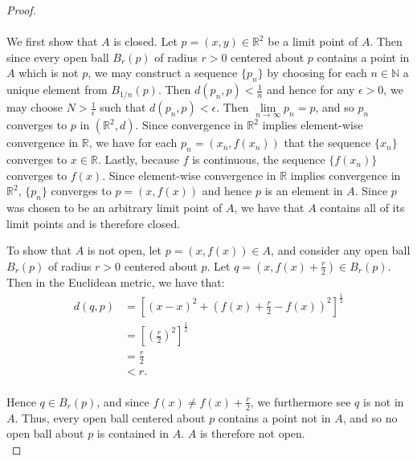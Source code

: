 \begin{proof}\ \\\\
    We first show that $A$ is closed. Let $p = (x, y) \in \mathbb{R}^2$ be a limit point of $A$. Then since every open
    ball $B_r(p)$ of radius $r > 0$ centered about $p$ contains a point in $A$ which is not $p$, we may construct a 
    sequence $\{ p_n \}$ by choosing for each $n \in \mathbb{N}$ a unique element from $B_{1/n}(p)$. Then 
    $d(p_n, p) < \frac{1}{n}$ and hence for any $\epsilon > 0$, we may choose $N > \frac{1}{\epsilon}$ such 
    that $d(p_n, p) < \epsilon$. Then $\lim\limits_{n \to \infty}{p_n} = p$, and so $p_n$ converges to $p$ in
    $(\mathbb{R}^2, d)$. Since convergence in $\mathbb{R}^2$ implies element-wise convergence in $\mathbb{R}$, we have 
    for each $p_n = (x_n, f(x_n))$ that the sequence $\{x_n\}$ converges to $x \in \mathbb{R}$. Lastly, because $f$ is 
    continuous, the sequence $\{ f(x_n) \}$ converges to $f(x)$. Since element-wise convergence in $\mathbb{R}$ implies 
    convergence in $\mathbb{R}^2$, $\{p_n\}$ converges to $p = (x, f(x))$ and hence $p$ is an element in $A$. Since $p$ 
    was chosen to be an arbitrary limit point of $A$, we have that $A$ contains all of its limit points and is therefore
    closed.

    To show that $A$ is not open, let $p = (x, f(x)) \in A$, and consider any open ball $B_r(p)$ of radius $r > 0$ 
    centered about $p$. Let $q = (x, f(x) + \frac{r}{2}) \in B_r(p)$. Then in the Euclidean metric, we have that:
    \begin{align*}
        d(q, p) &= \left[(x - x)^2 + \left( f(x) + \frac{r}{2} - f(x) \right)^2\right]^\frac{1}{2} \\
                &= \left[ \left(\frac{r}{2}\right)^2 \right]^\frac{1}{2} \\
                &= \frac{r}{2} \\
                &< r. \\
    \end{align*}
    
    Hence $q \in B_r(p)$, and since $f(x) \neq f(x) + \frac{r}{2}$, we furthermore see $q$ is not in $A$. Thus, every 
    open ball centered about $p$ contains a point not in $A$, and so no open ball about $p$ is contained in $A$. $A$ is
    therefore not open.
    \ \\
\end{proof}

\pagebreak